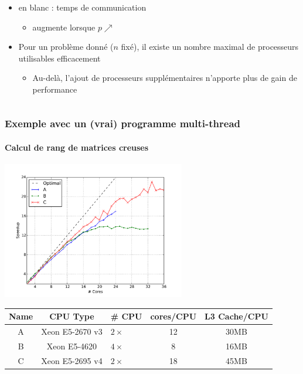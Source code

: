 \documentclass[xcolor={x11names,svgnames}]{beamer}
\begin{document}
\begin{frame}
\begin{columns}
\begin{column}{0.63\textwidth}
\begin{itemize}
        \medskip
        
      \item en blanc : temps de communication
        \begin{itemize}
        \item augmente lorsque $p \nearrow$
        \end{itemize}

        \medskip
        
      \item Pour un problème donné ($n$ fixé), il existe un nombre maximal de
        processeurs utilisables efficacement
        \begin{itemize}
        \item Au-delà, l'ajout de processeurs supplémentaires n'apporte plus
          de gain de performance
        \end{itemize}
      \end{itemize}
    \end{column}
  \end{columns}  
\end{frame}


\begin{frame}
\frametitle{Exemple avec un (vrai) programme multi-thread}
\framesubtitle{Calcul de rang de matrices creuses}

\centering
\includegraphics[height=6cm]{d19.pdf}

\medskip

\small
  \begin{tabular}{|c|c|l|c|c|}
\hline
Name & CPU Type        & \# CPU     & cores/CPU & L3 Cache/CPU\\
\hline\hline
A    & Xeon E5-2670 v3 & $2 \times$ & 12        & 30MB\\
\hline
B    & Xeon E5-4620    & $4 \times$ & 8         & 16MB\\
\hline
C    & Xeon E5-2695 v4 & $2 \times$ & 18        & 45MB\\
\hline
\end{tabular}



\end{frame}
\end{document}
